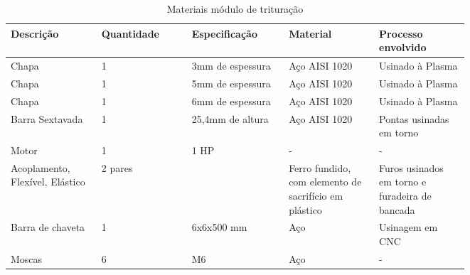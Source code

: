 \begin{table}[!h]
    \centering
    \caption{Materiais módulo de trituração}
    \label{my-label}
    \begin{tabular}{|p{0.15\linewidth}|p{0.15\linewidth}|p{0.15\linewidth}|p{0.15\linewidth}|p{0.15\linewidth}|}
    \hline
    \textbf{Descrição}              & \textbf{Quantidade} & \textbf{Especificação}                                            & \textbf{Material}                                     & \textbf{Processo envolvido}                    \\ \hline
    Chapa                           & 1                   & 3mm de espessura                                                  & Aço AISI 1020                                         & Usinado à Plasma                               \\ \hline
    Chapa                           & 1                   & 5mm de espessura                                                  & Aço AISI 1020                                         & Usinado à Plasma                               \\ \hline
    Chapa                           & 1                   & 6mm de espessura                                                  & Aço AISI 1020                                         & Usinado à Plasma                               \\ \hline
    Barra Sextavada                 & 1                   & 25,4mm de altura                                                  & Aço AISI 1020                                         & Pontas usinadas em torno                       \\ \hline
    Motor                           & 1                   & 1 HP                                                              & -                                                     & -                                              \\ \hline
    Acoplamento, Flexível, Elástico & 2 pares             &                                                                   & Ferro fundido, com elemento de sacrifício em plástico & Furos usinados em torno e furadeira de bancada \\ \hline
    Barra de chaveta                & 1                   & 6x6x500 mm                                                        & Aço                                                   & Usinagem em CNC                                \\ \hline
    Moscas                          & 6                   & M6                                                                & Aço                                                   & -                                              \\ \hline

\end{tabular}
\end{table}

